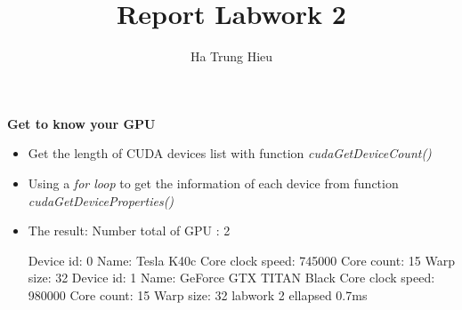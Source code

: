 \documentclass{article}
\title{Report Labwork 2}
\author{Ha Trung Hieu}
\begin{document}
\maketitle

\textbf{Get to know your GPU}

\begin{itemize}
	\item Get the length of CUDA devices list with function \textit{cudaGetDeviceCount()}
		
	\item Using a \textit{for loop} to get the information of each device from function \textit{cudaGetDeviceProperties()}
		
	\item The result:\newline
	Number total of GPU : 2\newline

    Device id: 0\newline
    Name: Tesla K40c\newline
    Core clock speed: 745000\newline
    Core count: 15\newline
    Warp size: 32\newline
    Device id: 1\newline
    Name: GeForce GTX TITAN Black\newline
    Core clock speed: 980000\newline
    Core count: 15\newline
    Warp size: 32\newline
    labwork 2 ellapsed 0.7ms\newline
\end{itemize}
\end{document}
